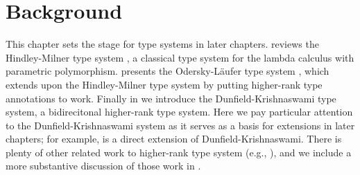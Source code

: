 \chapter{Background}
\label{chap:Background}

This chapter sets the stage for type systems in later chapters. 
reviews the Hindley-Milner type system \citep{Damas:Milner,hindley,milner}, a
classical type system for the lambda calculus with parametric polymorphism.
 presents the Odersky-L{\"a}ufer type system
\citep{odersky:putting}, which extends upon the Hindley-Milner type system by
putting higher-rank type annotations to work. Finally in  we
introduce the Dunfield-Krishnaswami type system, a bidirecitonal higher-rank
type system. Here we pay particular attention to the Dunfield-Krishnaswami
system as it serves as a basis for extensions in later chapters; for example,
 is a direct extension of Dunfield-Krishnaswami. There is
plenty of other related work to higher-rank type system (e.g.,
\cite{practical:inference}), and we include a more substantive discussion of
those work in .







